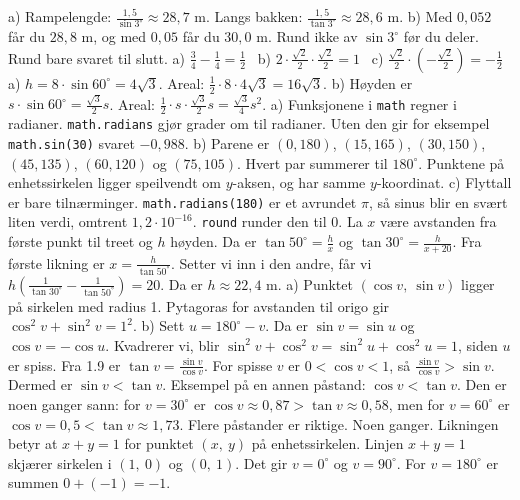  a) Rampelengde: $\frac{1,5}{\sin 3^\circ} \approx 28,7$ m. Langs bakken: $\frac{1,5}{\tan 3^\circ} \approx 28,6$ m. b) Med $0,052$ får du $28,8$ m, og med $0,05$ får du $30,0$ m. Rund ikke av $\sin 3^\circ$ før du deler. Rund bare svaret til slutt.
 a) $\frac34 - \frac14 = \frac12$ \ b) $2 \cdot \frac{\sqrt2}{2} \cdot \frac{\sqrt2}{2} = 1$ \ c) $\frac{\sqrt2}{2} \cdot \left(-\frac{\sqrt2}{2}\right) = -\frac12$
 a) $h = 8 \cdot \sin 60^\circ = 4\sqrt3$. Areal: $\frac12 \cdot 8 \cdot 4\sqrt3 = 16\sqrt3$.
b) Høyden er $s \cdot \sin 60^\circ = \frac{\sqrt3}{2}s$. Areal: $\frac12 \cdot s \cdot \frac{\sqrt3}{2}s = \frac{\sqrt3}{4}s^2$.
 a) Funksjonene i \lstinline[style=laereverk,numbers=none,frame=none]|math| regner i radianer. \lstinline[style=laereverk,numbers=none,frame=none]|math.radians| gjør grader om til radianer. Uten den gir for eksempel \lstinline[style=laereverk,numbers=none,frame=none]|math.sin(30)| svaret $-0,988$.
b) Parene er $(0,180)$, $(15,165)$, $(30,150)$, $(45,135)$, $(60,120)$ og $(75,105)$. Hvert par summerer til $180^\circ$. Punktene på enhetssirkelen ligger speilvendt om $y$-aksen, og har samme $y$-koordinat.
c) Flyttall er bare tilnærminger. \lstinline[style=laereverk,numbers=none,frame=none]|math.radians(180)| er et avrundet $\pi$, så sinus blir en svært liten verdi, omtrent $1,2 \cdot 10^{-16}$. \lstinline[style=laereverk,numbers=none,frame=none]|round| runder den til $0$.
 La $x$ være avstanden fra første punkt til treet og $h$ høyden. Da er $\tan 50^\circ = \frac{h}{x}$ og $\tan 30^\circ = \frac{h}{x+20}$.
Fra første likning er $x = \frac{h}{\tan 50^\circ}$. Setter vi inn i den andre, får vi $h\left(\frac{1}{\tan 30^\circ} - \frac{1}{\tan 50^\circ}\right) = 20$. Da er $h \approx 22,4$ m.
 a) Punktet $(\cos v,\ \sin v)$ ligger på sirkelen med radius 1. Pytagoras for avstanden til origo gir $\cos^2 v + \sin^2 v = 1^2$.
b) Sett $u = 180^\circ - v$. Da er $\sin v = \sin u$ og $\cos v = -\cos u$. Kvadrerer vi, blir $\sin^2 v + \cos^2 v = \sin^2 u + \cos^2 u = 1$, siden $u$ er spiss.
 Fra 1.9 er $\tan v = \frac{\sin v}{\cos v}$. For spisse $v$ er $0 < \cos v < 1$, så $\frac{\sin v}{\cos v} > \sin v$. Dermed er $\sin v < \tan v$.
Eksempel på en annen påstand: $\cos v < \tan v$. Den er noen ganger sann: for $v = 30^\circ$ er $\cos v \approx 0,87 > \tan v \approx 0,58$, men for $v = 60^\circ$ er $\cos v = 0,5 < \tan v \approx 1,73$. Flere påstander er riktige.
 Noen ganger. Likningen betyr at $x + y = 1$ for punktet $(x,\ y)$ på enhetssirkelen. Linjen $x + y = 1$ skjærer sirkelen i $(1,\ 0)$ og $(0,\ 1)$. Det gir $v = 0^\circ$ og $v = 90^\circ$. For $v = 180^\circ$ er summen $0 + (-1) = -1$.
